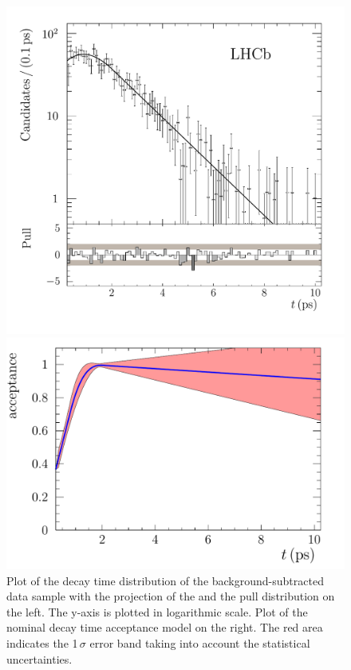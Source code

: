 \begin{figure}[htb]
\hspace*{\fill}
\begin{minipage}{0.4\textwidth}
\includegraphics[width=\textwidth]{07-B02DD/tikz/pdf/obsTime_summed_pull_logy.pdf}
\end{minipage}
\hfill
\begin{minipage}{0.5\textwidth}
\includegraphics[width=\textwidth]{07-B02DD/tikz/pdf/Acceptancespline_nolog.pdf}
\end{minipage}
\hspace*{\fill}
\caption{Plot of the decay time distribution of the background-subtracted \BdToDD
data sample with the projection of the \PDF and the pull distribution on the
left. The y-axis is plotted in logarithmic scale. Plot of the nominal decay
time acceptance model on the right. The red area indicates the 1\,$\sigma$
error band taking into account the statistical uncertainties.}
\label{fig:b02dd:decaytimefit}
\end{figure}


